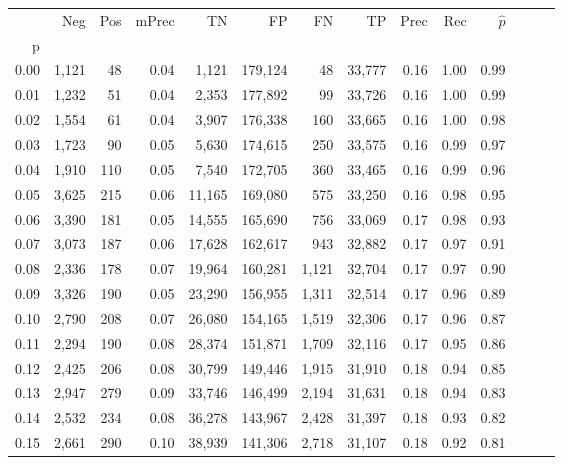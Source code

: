 \begin{tabular}{rrrrrrrrrrrrrr}
\toprule
{} &    Neg &  Pos & mPrec &       TN &       FP &      FN &      TP &  Prec &   Rec & $\hat{p}$ \\
p    &        &      &       &          &          &         &         &       &       &           \\
\midrule
0.00 &  1,121 &   48 &  0.04 &    1,121 &  179,124 &      48 &  33,777 &  0.16 &  1.00 &      0.99 \\
0.01 &  1,232 &   51 &  0.04 &    2,353 &  177,892 &      99 &  33,726 &  0.16 &  1.00 &      0.99 \\
0.02 &  1,554 &   61 &  0.04 &    3,907 &  176,338 &     160 &  33,665 &  0.16 &  1.00 &      0.98 \\
0.03 &  1,723 &   90 &  0.05 &    5,630 &  174,615 &     250 &  33,575 &  0.16 &  0.99 &      0.97 \\
0.04 &  1,910 &  110 &  0.05 &    7,540 &  172,705 &     360 &  33,465 &  0.16 &  0.99 &      0.96 \\
0.05 &  3,625 &  215 &  0.06 &   11,165 &  169,080 &     575 &  33,250 &  0.16 &  0.98 &      0.95 \\
0.06 &  3,390 &  181 &  0.05 &   14,555 &  165,690 &     756 &  33,069 &  0.17 &  0.98 &      0.93 \\
0.07 &  3,073 &  187 &  0.06 &   17,628 &  162,617 &     943 &  32,882 &  0.17 &  0.97 &      0.91 \\
0.08 &  2,336 &  178 &  0.07 &   19,964 &  160,281 &   1,121 &  32,704 &  0.17 &  0.97 &      0.90 \\
0.09 &  3,326 &  190 &  0.05 &   23,290 &  156,955 &   1,311 &  32,514 &  0.17 &  0.96 &      0.89 \\
0.10 &  2,790 &  208 &  0.07 &   26,080 &  154,165 &   1,519 &  32,306 &  0.17 &  0.96 &      0.87 \\
0.11 &  2,294 &  190 &  0.08 &   28,374 &  151,871 &   1,709 &  32,116 &  0.17 &  0.95 &      0.86 \\
0.12 &  2,425 &  206 &  0.08 &   30,799 &  149,446 &   1,915 &  31,910 &  0.18 &  0.94 &      0.85 \\
0.13 &  2,947 &  279 &  0.09 &   33,746 &  146,499 &   2,194 &  31,631 &  0.18 &  0.94 &      0.83 \\
0.14 &  2,532 &  234 &  0.08 &   36,278 &  143,967 &   2,428 &  31,397 &  0.18 &  0.93 &      0.82 \\
0.15 &  2,661 &  290 &  0.10 &   38,939 &  141,306 &   2,718 &  31,107 &  0.18 &  0.92 &      0.81 \\

\end{tabular}
